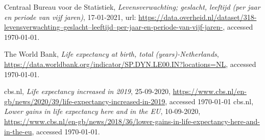 \documentclass{article}
\begin{document}
\begin{thebibliography}	{}

 Centraal Bureau voor de Statistiek, \textit{Levensverwachting; geslacht, leeftijd (per jaar en periode van vijf jaren)}, 17-01-2021, url:
\href{https://data.overheid.nl/dataset/318-levensverwachting--geslacht--leeftijd--per-jaar-en-periode-van-vijf-jaren-}{https://data.overheid.nl/dataset/318-levensverwachting--geslacht--leeftijd--per-jaar-en-periode-van-vijf-jaren-}, accessed {\today}. 

 The World Bank, \textit{Life expectancy at birth, total (years)-Netherlands}, \href{https://data.worldbank.org/indicator/SP.DYN.LE00.IN?locations=NL}{https://data.worldbank.org/indicator/SP.DYN.LE00.IN?locations=NL}, accessed {\today}.

cbs.nl, \textit{Life expectancy increased in 2019}, 25-09-2020, \href{https://www.cbs.nl/en-gb/news/2020/39/life-expectancy-increased-in-2019}{https://www.cbs.nl/en-gb/news/2020/39/life-expectancy-increased-in-2019}, accessed {\today}
cbs.nl, \textit{Lower gains in life expectancy here and in the EU}, 10-09-2020, \href{https://www.cbs.nl/en-gb/news/2018/36/lower-gains-in-life-expectancy-here-and-in-the-eu}{https://www.cbs.nl/en-gb/news/2018/36/lower-gains-in-life-expectancy-here-and-in-the-eu}, accessed {\today}.


\end{thebibliography}
\end{document}

